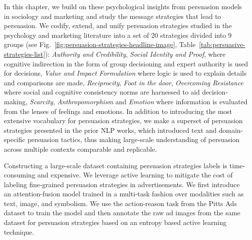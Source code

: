 \documentclass[hidelinks,11pt,a4paper]{report}
\renewcommand{\cite}[1]{\citep{#1}}
\begin{document}
In this chapter, we build on these psychological insights from persuasion models in sociology and marketing and study the message strategies that lead to persuasion. We codify, extend, and unify persuasion strategies studied in the psychology and marketing literature into a set of 20 strategies divided into 9 groups (see Fig.~\ref{fig:persuasion-strategies-headline-image}, Table~\ref{tab:persuasive-strategies-list}): \textit{Authority and Credibility}, \textit{Social Identity and Proof}, where cognitive indirection in the form of group decisioning and expert authority is used for decisions, \textit{Value and Impact Formulation} where logic is used to explain details and comparisons are made, \textit{Reciprocity}, \textit{Foot in the door}, \textit{Overcoming Resistance} where social and cognitive consistency norms are harnessed to aid decision-making, \textit{Scarcity}, \textit{Anthropomorphism} and \textit{Emotion} where information is evaluated from the lenses of feelings and emotions. In addition to introducing the most extensive vocabulary for persuasion strategies, we make a superset of persuasion strategies presented in the prior NLP works, which introduced text and domain-specific
persuasion tactics, thus making large-scale understanding of persuasion across multiple contexts comparable and replicable.


Constructing a large-scale dataset containing persuasion strategies labels is time-consuming and expensive. We leverage active learning to mitigate the cost of labeling fine-grained persuasion strategies in advertisements. We first introduce an attention-fusion model trained in a multi-task fashion over modalities such as text, image, and symbolism. We use the action-reason task from the Pitts Ads dataset \cite{hussain2017automatic} to train the model and then annotate the raw ad images from the same dataset for persuasion strategies based on an entropy based active learning technique.


\end{document}
